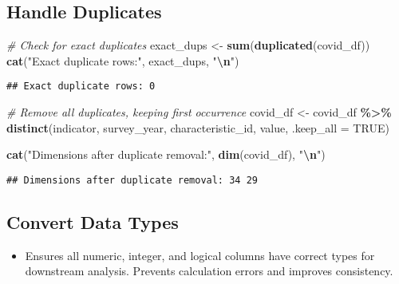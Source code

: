 \documentclass[
]{article}
\newenvironment{Shaded}{\begin{snugshade}}{\end{snugshade}}
\newcommand{\AttributeTok}[1]{\textcolor[rgb]{0.13,0.29,0.53}{#1}}
\newcommand{\CommentTok}[1]{\textcolor[rgb]{0.56,0.35,0.01}{\textit{#1}}}
\newcommand{\ConstantTok}[1]{\textcolor[rgb]{0.56,0.35,0.01}{#1}}
\newcommand{\FunctionTok}[1]{\textcolor[rgb]{0.13,0.29,0.53}{\textbf{#1}}}
\newcommand{\NormalTok}[1]{#1}
\newcommand{\OtherTok}[1]{\textcolor[rgb]{0.56,0.35,0.01}{#1}}
\newcommand{\SpecialCharTok}[1]{\textcolor[rgb]{0.81,0.36,0.00}{\textbf{#1}}}
\newcommand{\StringTok}[1]{\textcolor[rgb]{0.31,0.60,0.02}{#1}}
\providecommand{\tightlist}{%
  \setlength{\itemsep}{0pt}\setlength{\parskip}{0pt}}
\begin{document}
\subsection{Handle Duplicates}\label{handle-duplicates}

\begin{Shaded}
\begin{Highlighting}[]
\CommentTok{\# Check for exact duplicates}
\NormalTok{exact\_dups }\OtherTok{\textless{}{-}} \FunctionTok{sum}\NormalTok{(}\FunctionTok{duplicated}\NormalTok{(covid\_df))}
\FunctionTok{cat}\NormalTok{(}\StringTok{"Exact duplicate rows:"}\NormalTok{, exact\_dups, }\StringTok{"}\SpecialCharTok{\textbackslash{}n}\StringTok{"}\NormalTok{)}
\end{Highlighting}
\end{Shaded}

\begin{verbatim}
## Exact duplicate rows: 0
\end{verbatim}

\begin{Shaded}
\begin{Highlighting}[]
\CommentTok{\# Remove all duplicates, keeping first occurrence}
\NormalTok{covid\_df }\OtherTok{\textless{}{-}}\NormalTok{ covid\_df }\SpecialCharTok{\%\textgreater{}\%}
  \FunctionTok{distinct}\NormalTok{(indicator, survey\_year, characteristic\_id, value, }\AttributeTok{.keep\_all =} \ConstantTok{TRUE}\NormalTok{)}

\FunctionTok{cat}\NormalTok{(}\StringTok{"Dimensions after duplicate removal:"}\NormalTok{, }\FunctionTok{dim}\NormalTok{(covid\_df), }\StringTok{"}\SpecialCharTok{\textbackslash{}n}\StringTok{"}\NormalTok{)}
\end{Highlighting}
\end{Shaded}

\begin{verbatim}
## Dimensions after duplicate removal: 34 29
\end{verbatim}

\subsection{Convert Data Types}\label{convert-data-types}

\begin{itemize}
\tightlist
\item
  Ensures all numeric, integer, and logical columns have correct types
  for downstream analysis. Prevents calculation errors and improves
  consistency.
\end{itemize}
\end{document}
